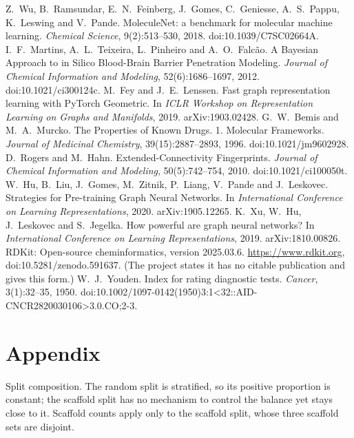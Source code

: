 \documentclass[11pt,a4paper]{article}
\begin{document}

\begin{thebibliography}{9}
 Z.~Wu, B.~Ramsundar, E.~N.~Feinberg, J.~Gomes, C.~Geniesse, A.~S.~Pappu, K.~Leswing and
V.~Pande. MoleculeNet: a benchmark for molecular machine learning. \emph{Chemical Science}, 9(2):513--530,
2018. doi:10.1039/C7SC02664A.
 I.~F.~Martins, A.~L.~Teixeira, L.~Pinheiro and A.~O.~Falcão. A Bayesian Approach to
in Silico Blood-Brain Barrier Penetration Modeling. \emph{Journal of Chemical Information and
Modeling}, 52(6):1686--1697, 2012. doi:10.1021/ci300124c.
 M.~Fey and J.~E.~Lenssen. Fast graph representation learning with PyTorch Geometric. In
\emph{ICLR Workshop on Representation Learning on Graphs and Manifolds}, 2019. arXiv:1903.02428.
 G.~W.~Bemis and M.~A.~Murcko. The Properties of Known Drugs. 1. Molecular Frameworks.
\emph{Journal of Medicinal Chemistry}, 39(15):2887--2893, 1996. doi:10.1021/jm9602928.
 D.~Rogers and M.~Hahn. Extended-Connectivity Fingerprints. \emph{Journal of Chemical
Information and Modeling}, 50(5):742--754, 2010. doi:10.1021/ci100050t.
 W.~Hu, B.~Liu, J.~Gomes, M.~Zitnik, P.~Liang, V.~Pande and J.~Leskovec. Strategies for
Pre-training Graph Neural Networks. In \emph{International Conference on Learning Representations}, 2020.
arXiv:1905.12265.
 K.~Xu, W.~Hu, J.~Leskovec and S.~Jegelka. How powerful are graph neural networks? In
\emph{International Conference on Learning Representations}, 2019. arXiv:1810.00826.
 RDKit: Open-source cheminformatics, version 2025.03.6. \url{https://www.rdkit.org},
doi:10.5281/zenodo.591637. (The project states it has no citable publication and gives this form.)
 W.~J.~Youden. Index for rating diagnostic tests. \emph{Cancer}, 3(1):32--35, 1950.
doi:10.1002/1097-0142(1950)3:1<32::AID-CNCR2820030106>3.0.CO;2-3.
\end{thebibliography}

\clearpage
\appendix
\setcounter{table}{0}
\renewcommand{\thetable}{A\arabic{table}}
\section*{Appendix}

\begin{table}[h]
\centering\footnotesize
\caption{Split composition. The random split is stratified, so its positive proportion is constant; the
scaffold split has no mechanism to control the balance yet stays close to it. Scaffold counts apply only
to the scaffold split, whose three scaffold sets are disjoint.}
\label{tab:splits}

\end{table}
\end{document}
